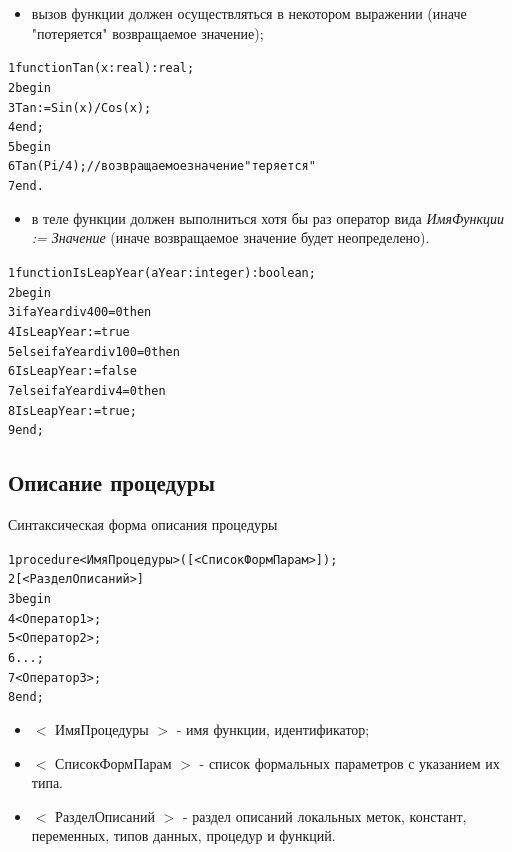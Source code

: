 \documentclass{beamer}
\begin{document}
\begin{frame}[fragile]
\begin{itemize}
\item вызов функции должен осуществляться в некотором выражении (иначе "потеряется" возвращаемое значение);
\end{itemize}
\begin{alltt}
1 function Tan(x: real):real;
2 begin
3   Tan := Sin(x)/Cos(x);
4 end;
5 begin
6   Tan(Pi/4); //возвращаемое значение "теряется"
7 end.
\end{alltt}
\end{frame}

\begin{frame}[fragile]
\begin{itemize}
\item в теле функции должен выполниться хотя бы раз оператор вида \textit{ИмяФункции := Значение} (иначе возвращаемое значение будет неопределено).
\end{itemize}
\begin{alltt}
1 function IsLeapYear(aYear: integer):boolean;
2 begin
3   if aYear div 400 = 0 then
4      IsLeapYear := true
5   else if aYear div 100 = 0 then
6      IsLeapYear := false
7   else if aYear div 4 = 0 then
8      IsLeapYear := true;
9 end;
\end{alltt}
\end{frame}

\subsection{Описание процедуры}
\begin{frame}[fragile]{Синтаксическая форма описания процедуры}
\begin{alltt}
1 procedure <ИмяПроцедуры>([<СписокФормПарам>]);
2     [<РазделОписаний>]
3 begin
4   <Оператор1>;
5   <Оператор2>;
6   ...;
7   <Оператор3>;
8 end;
\end{alltt}
\begin{itemize}
\item $<$ ИмяПроцедуры $>$ - имя функции, идентификатор;
\item $<$ СписокФормПарам $>$ - список формальных параметров с указанием их типа.
\item $<$ РазделОписаний $>$ - раздел описаний локальных меток, констант, переменных, типов данных, процедур и функций.
\end{itemize}
\end{frame}
\end{document}
